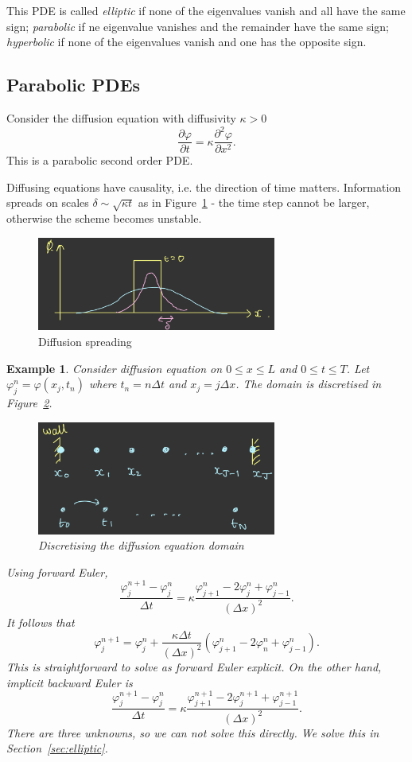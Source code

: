 \documentclass[11pt, a4paper]{article}
\renewcommand{\phi}{\varphi}
\theoremstyle{break}
\newtheorem{eg}[thm]{Example}
\newcommand*{\Paren}[1]{\left(#1\right)}%
\newcommand{\dt}{\Delta t}
\newcommand{\dx}{\Delta x}
\newcommand{\der}[2]{\frac{\partial #1}{\partial #2}}
\newcommand{\pder}[3][2]{\frac{\partial^#1 #2}{\partial #3^#1}}
\begin{document}
This PDE is called \emph{elliptic} if none of the eigenvalues vanish and all have the same sign; \emph{parabolic} if ne eigenvalue vanishes and the remainder have the same sign; \emph{hyperbolic} if none of the eigenvalues vanish and one has the opposite sign.

\subsection{Parabolic PDEs}

Consider the diffusion equation with diffusivity $\kappa>0$ \[\der\phi t=\kappa\pder\phi x.\] This is a parabolic second order PDE. 

Diffusing equations have causality, i.e. the direction of time matters. Information spreads on scales $\delta\sim\sqrt{\kappa t}$ as in Figure~\ref{fig:diffusionTopHat} - the time step cannot be larger, otherwise the scheme becomes unstable.

\begin{figure}
	\centering
	\includegraphics[width=0.7\textwidth]{diffusionSpreading}
	\caption{Diffusion spreading}
	\label{fig:diffusionTopHat}
\end{figure}

\begin{eg}
	Consider diffusion equation on $0\leq x\leq L$ and $0\leq t\leq T$.  Let $\phi_j^n=\phi(x_j,t_n)$ where $t_n=n\dt$ and $x_j=j\dx$. The domain is discretised in Figure~\ref{fig:diffusionDiscret}.
	
	\begin{figure}\centering
		\includegraphics[width=0.7\textwidth]{discretisingDiffusion}
		\caption{Discretising the diffusion equation domain}\label{fig:diffusionDiscret}
	\end{figure}
	
	Using forward Euler, \[\frac{\phi_j^{n+1}-\phi_j^n}{\dt}=\kappa\frac{\phi_{j+1}^n-2\phi_j^n+\phi^n_{j-1}}{(\dx)^2}.\] It follows that \[\phi_j^{n+1}=\phi_j^n+\frac{\kappa\dt}{(\dx)^2}\Paren{\phi_{j+1}^n-2\phi_n^n+\phi_{j-1}^n}.\] This is straightforward to solve as forward Euler explicit. On the other hand, implicit backward Euler is \[\frac{\phi_j^{n+1}-\phi_j^n}{\dt}=\kappa\frac{\phi_{j+1}^{n+1}-2\phi_j^{n+1}+\phi^{n+1}_{j-1}}{(\dx)^2}.\] There are three unknowns, so we can not solve this directly. We solve this in Section~\ref{sec:elliptic}.

\end{eg}
\end{document}
